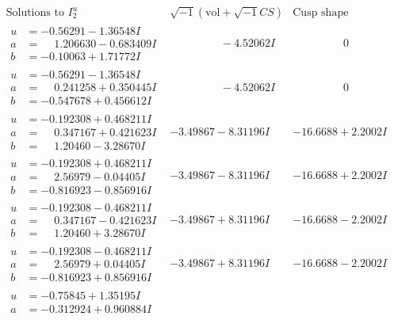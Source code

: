 \documentclass[1p]{elsarticle_modified}
\theoremstyle{definition}
\newcommand{\I}{\sqrt{-1}}
\begin{document}
$$\begin{array}{c|c|c}
\text{Solutions to }I^u_{2}& \I (\text{vol} + \sqrt{-1}CS) & \text{Cusp shape}\\
 \hline 
\begin{aligned}
u &= -0.56291 - 1.36548 I \\
a &= \phantom{-}1.206630 - 0.683409 I \\
b &= -0.10063 + 1.71772 I\end{aligned}
 & \phantom{-0.000000 } -4.52062 I & \phantom{-0.000000 } 0 \\ \hline\begin{aligned}
u &= -0.56291 - 1.36548 I \\
a &= \phantom{-}0.241258 + 0.350445 I \\
b &= -0.547678 + 0.456612 I\end{aligned}
 & \phantom{-0.000000 } -4.52062 I & \phantom{-0.000000 } 0 \\ \hline\begin{aligned}
u &= -0.192308 + 0.468211 I \\
a &= \phantom{-}0.347167 + 0.421623 I \\
b &= \phantom{-}1.20460 - 3.28670 I\end{aligned}
 & -3.49867 - 8.31196 I & -16.6688 + 2.2002 I \\ \hline\begin{aligned}
u &= -0.192308 + 0.468211 I \\
a &= \phantom{-}2.56979 - 0.04405 I \\
b &= -0.816923 - 0.856916 I\end{aligned}
 & -3.49867 - 8.31196 I & -16.6688 + 2.2002 I \\ \hline\begin{aligned}
u &= -0.192308 - 0.468211 I \\
a &= \phantom{-}0.347167 - 0.421623 I \\
b &= \phantom{-}1.20460 + 3.28670 I\end{aligned}
 & -3.49867 + 8.31196 I & -16.6688 - 2.2002 I \\ \hline\begin{aligned}
u &= -0.192308 - 0.468211 I \\
a &= \phantom{-}2.56979 + 0.04405 I \\
b &= -0.816923 + 0.856916 I\end{aligned}
 & -3.49867 + 8.31196 I & -16.6688 - 2.2002 I \\ \hline\begin{aligned}
u &= -0.75845 + 1.35195 I \\
a &= -0.312924 + 0.960884 I \\

\end{aligned}
\end{array}$$
\end{document}
